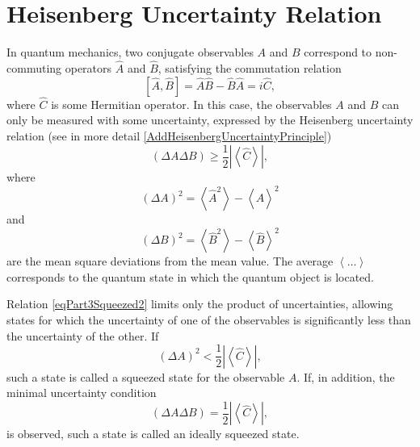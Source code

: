 \section{Heisenberg Uncertainty Relation}
In quantum mechanics, two conjugate observables $A$ and $B$
correspond to non-commuting operators $\hat{A}$ and $\hat{B}$,
satisfying the commutation relation
\begin{equation}
\left[
\hat{A}, \hat{B}
\right] = 
\hat{A}\hat{B} - \hat{B}\hat{A} = i \hat{C},
\nonumber
\end{equation}
where $\hat{C}$ is some Hermitian operator. In this case, the observables
$A$ and $B$ can only be measured with some uncertainty,
expressed by the Heisenberg uncertainty relation
(see in more detail \autoref{AddHeisenbergUncertaintyPrinciple})
\begin{equation}
\left(
\Delta A \Delta B
\right) \ge \frac{1}{2} \left|\left<\hat{C}\right>\right|,
\label{eqPart3Squeezed2}
\end{equation}
where
\[
\left(\Delta A\right)^2 = \left<\hat{A}^2\right> - \left<\hat{A}\right>^2
\]
and
\[
\left(\Delta B\right)^2 = \left<\hat{B}^2\right> - \left<\hat{B}\right>^2
\]
are the mean square deviations from the mean value.
The average $\left<\dots\right>$ corresponds to the quantum state in
which the quantum object is located.

Relation \eqref{eqPart3Squeezed2} limits only the product
of uncertainties, allowing states for which the uncertainty
of one of the observables is significantly less than the uncertainty of the other.
If
\begin{equation}
\left(\Delta A\right)^2 < \frac{1}{2} \left|\left<\hat{C}\right>\right|,
\nonumber
\end{equation}
such a state is called a squeezed state for the observable
$A$. If, in addition, the minimal uncertainty condition
\begin{equation}
\left(
\Delta A \Delta B
\right) = \frac{1}{2} \left|\left<\hat{C}\right>\right|,
\nonumber
\end{equation}
is observed, such a state is called an ideally squeezed state.
